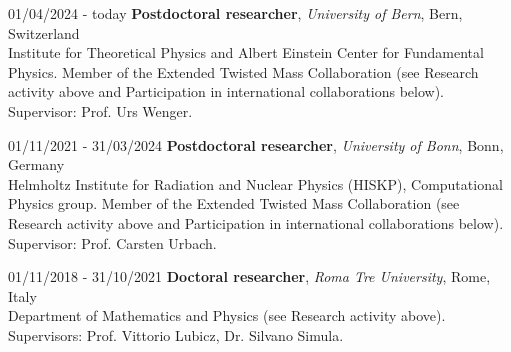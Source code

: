 
\begin{cvlist}
\item[01/04/2024 - today] \textbf{Postdoctoral researcher}, \textit{University of Bern}, Bern, Switzerland\\
Institute for Theoretical Physics and Albert Einstein Center for Fundamental Physics. Member of the Extended
Twisted Mass Collaboration (see Research activity above and Participation in international collaborations
below).\\
Supervisor: Prof. Urs Wenger.

\item[01/11/2021 - 31/03/2024] \textbf{Postdoctoral researcher}, \textit{University of Bonn}, Bonn, Germany\\
Helmholtz Institute for Radiation and Nuclear Physics (HISKP), Computational Physics group. Member of the
Extended Twisted Mass Collaboration (see Research activity above and Participation in international
collaborations below).\\
Supervisor: Prof. Carsten Urbach.

\item[01/11/2018 - 31/10/2021] \textbf{Doctoral researcher}, \textit{Roma Tre University}, Rome, Italy\\
Department of Mathematics and Physics (see Research activity above).\\
Supervisors: Prof. Vittorio Lubicz, Dr. Silvano Simula.
\end{cvlist}



